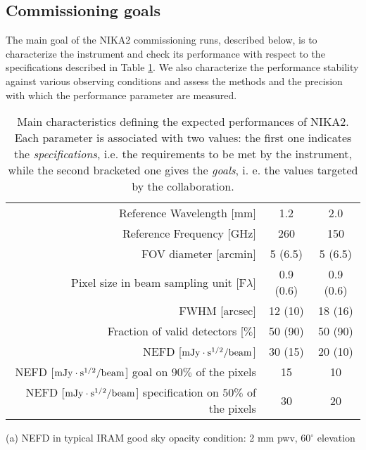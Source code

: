 \subsection{Commissioning goals}
The main goal of the NIKA2 commissioning runs, described below, is to 
characterize the instrument and check its 
performance with respect to the specifications 
described in Table \ref{nika2specs}. 
We also characterize the performance stability 
against various observing conditions and 
assess the methods and the precision with which the performance parameter are measured.


\begin{table}[ht]
\begin{center}
\begin{threeparttable}
\begin{tabular}{|r|c|c|}
  \hline
  \hline
Reference Wavelength  [mm]  &  1.2 & 2.0  \\
Reference Frequency  [GHz]  &  260 & 150  \\
\hline  
\hline
FOV diameter [arcmin]       &  5 (6.5)    &  5 (6.5)   \\
Pixel size in beam sampling unit [F$\lambda$]  &  0.9 (0.6)   &   0.9 (0.6)  \\
FWHM  [arcsec]              &  12 (10)   &  18 (16) \\
Fraction of valid detectors [$\%$] &  50 (90)   &  50 (90) \\
NEFD\tnote{a}\hspace{1mm}   [$\rm{mJy} \cdot \rm{s}^{1/2}/\rm{beam}$]  &  30 (15)   &  20 (10) \\
\hline
NEFD [$\rm{mJy} \cdot \rm{s}^{1/2}/\rm{beam}$] goal on $90\%$ of the pixels  &  15  & 10 \\
NEFD [$\rm{mJy} \cdot \rm{s}^{1/2}/\rm{beam}$] specification on $50\%$ of the pixels  &  30  &  20  \\
\hline
\end{tabular}
\begin{tablenotes}
{\small
  \item[(a)] NEFD in typical IRAM good sky opacity condition: 2 mm pwv, $60^\circ$ elevation
}
\end{tablenotes}
\end{threeparttable}
\caption{Main characteristics defining the expected performances of NIKA2. Each parameter is associated with two values: the first one indicates the \emph{specifications}, i.e. the requirements to be met by the instrument, while the second bracketed one gives the \emph{goals}, i. e. the values targeted by the collaboration.}
\label{nika2specs}
\end{center}
\end{table} 


